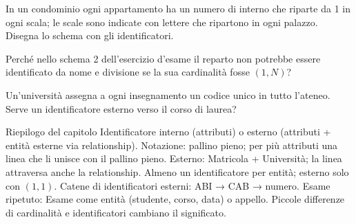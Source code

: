 \begin{esercizi}
\begin{passi}
  \item In un condominio ogni appartamento ha un numero di interno che riparte da 1 in ogni scala; le scale sono indicate con lettere che ripartono in ogni palazzo. Disegna lo schema con gli identificatori.
  \item Perché nello schema 2 dell'esercizio d'esame il reparto non potrebbe essere identificato da nome e divisione se la sua cardinalità fosse $(1,N)$?
  \item Un'università assegna a ogni insegnamento un codice unico in tutto l'ateneo. Serve un identificatore esterno verso il corso di laurea?
\end{passi}
\end{esercizi}

\begin{appunti}{Riepilogo del capitolo}
 Identificatore interno (attributi) o esterno (attributi + entità esterne via relationship).
 Notazione: pallino pieno; per più attributi una linea che li unisce con il pallino pieno.
 Esterno: Matricola + Università; la linea attraversa anche la relationship.
 Almeno un identificatore per entità; esterno solo con $(1,1)$.
 Catene di identificatori esterni: ABI → CAB → numero.
 Esame ripetuto: Esame come entità (studente, corso, data) o appello.
 Piccole differenze di cardinalità e identificatori cambiano il significato.
\end{appunti}
